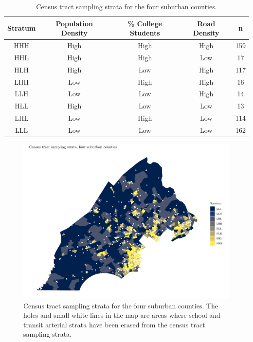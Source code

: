 \documentclass[paper=letterpaper, fontsize=11pt]{scrartcl}
\begin{document}
\begin{table}[!htbp]
	\renewcommand*{\arraystretch}{1.4}
	\centering 
	\caption{Census tract sampling strata for the four suburban counties.} 
	\label{SuburbStrata} 
	\begin{tabular}{|c c c c c|} 
		\hline 
		\textbf{Stratum} & \textbf{Population Density} & \textbf{\% College Students} & \textbf{Road Density} & \textbf{n} \\
		\hline
		HHH & High & High & High & 159 \\
		\hline
		HHL & High & High & Low & 17 \\
		\hline
		HLH & High & Low & High & 117 \\
		\hline
		LHH & Low & High & High & 16 \\
		\hline
		LLH & Low & Low & High & 14 \\
		\hline
		HLL & High & Low & Low & 13 \\
		\hline
		LHL & Low & High & Low & 114 \\
		\hline
		LLL & Low & Low & Low & 162 \\
		\hline
	\end{tabular} 
\end{table}

\FloatBarrier
\begin{figure}
	\centering
	\includegraphics[width = 9in]{suburb-areal.png}
	\caption{Census tract sampling strata for the four suburban counties. The holes and small white lines in the map are areas where school and transit arterial strata have been erased from the census tract sampling strata.} \label{suburb-areal}
\end{figure}
\FloatBarrier
\end{document}
